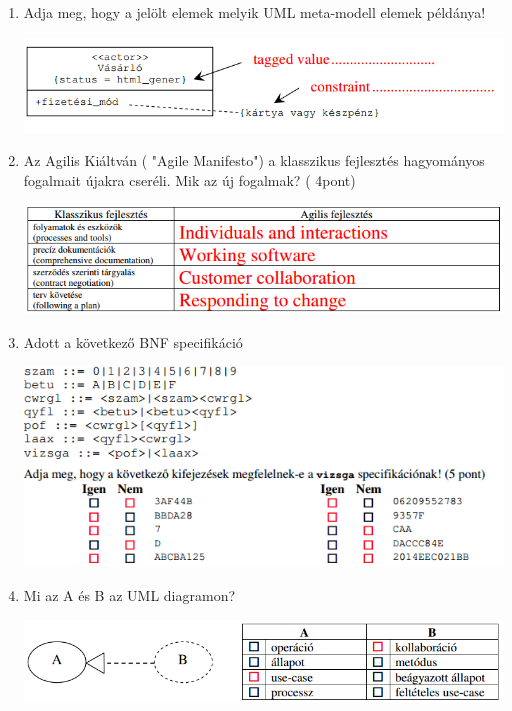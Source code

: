 \begin{enumerate}
	\item Adja meg, hogy a jelölt elemek melyik UML meta-modell elemek példánya!

		\begin{center}
			\includegraphics[scale=0.7]{img/table8}
		\end{center}

	\item Az Agilis Kiáltván ( "Agile Manifesto") a klasszikus fejlesztés hagyományos fogalmait újakra cseréli. Mik az új fogalmak? ( 4pont)

		\begin{center}
			\includegraphics[scale=0.7]{img/table9}
		\end{center}

	\item Adott a következő BNF specifikáció

		\begin{center}
			\includegraphics[scale=0.7]{img/table10}
		\end{center}

	\item Mi az A és B az UML diagramon?

		\begin{center}
			\includegraphics[scale=0.7]{img/table11}
		\end{center}


\end{enumerate}
